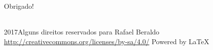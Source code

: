 \begin{frame}[standout]
  \Huge
  Obrigado!
\end{frame}

\begin{frame}
  \begin{center}
    \vspace{2em}
    {\LARGE\ccLogo{} \ccAttribution{} \ccShareAlike\\}
    2017\qquad Alguns direitos reservados para Rafael Beraldo
    \vspace{1em}
    \url{http://creativecommons.org/licenses/by-sa/4.0/}
    \vfill
    \huge{Powered by \LaTeX{}}
  \end{center}
\end{frame}

